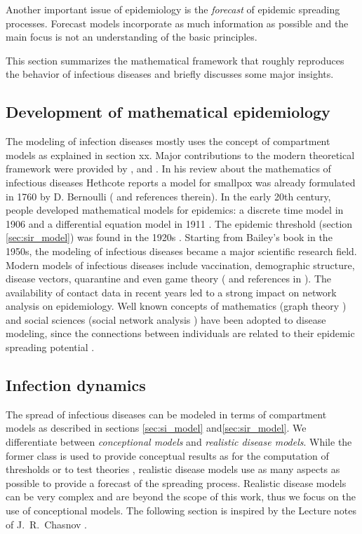 Another important issue of epidemiology is the \emph{forecast} of epidemic spreading processes.
Forecast models incorporate as much information as possible and the main focus is not an understanding of the basic principles.

This section summarizes the mathematical framework that roughly reproduces the behavior of infectious diseases and briefly discusses some major insights.

\subsection{Development of mathematical epidemiology}
The modeling of infection diseases mostly uses the concept of compartment models as explained in section xx.
Major contributions to the modern theoretical framework were provided by \citep{kermack:27}, \citep{bailey:57} and \citep{andersonmay:92}.
In his review about the mathematics of infectious diseases Hethcote reports a model for smallpox was already formulated in 1760 by D. Bernoulli (\citep{Hethcote:2000} and references therein).
In the early 20th century, people developed mathematical models for epidemics: a discrete time model in 1906 \citep{Hamer} and a differential equation model in 1911 \citep{Ross}.
The epidemic threshold (section \ref{sec:sir_model}) was found in the 1920s \citep{kermack:27}.
Starting from Bailey's book \citep{bailey:57} in the 1950s, the modeling of infectious diseases became a major scientific research field.
Modern models of infectious diseases include vaccination, demographic structure, disease vectors, quarantine and even game theory (\citep{Bauch:2004} and references in \citep{Hethcote:2000}).
The availability of contact data in recent years led to a strong impact on network analysis on epidemiology.
Well known concepts of mathematics (graph theory \citep{Bollobas:1985}) and social sciences (social network analysis \citep{WassermanFaust}) have been adopted to disease modeling, since the connections between individuals are related to their epidemic spreading potential \citep{Keeling:2005}.

\subsection{Infection dynamics}
The spread of infectious diseases can be modeled in terms of compartment models as described in sections \ref{sec:si_model} and\ref{sec:sir_model}.
We differentiate between \emph{conceptional models} and \emph{realistic disease models}.
While the former class is used to provide conceptual results as for the computation of thresholds or to test theories \citep{Hethcote:2000}, realistic disease models use as many aspects as possible to provide a forecast of the spreading process.
Realistic disease models can be very complex and are beyond the scope of this work, thus we focus on the use of conceptional models.
The following section is inspired by the Lecture notes of J.~R.~Chasnov \citep{Chasnov:2010}.

